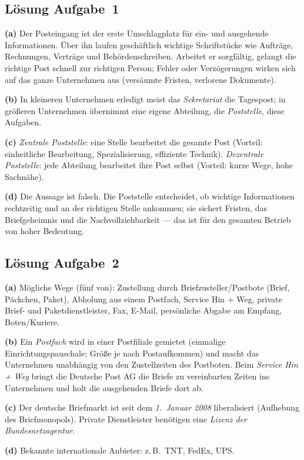 \documentclass[11pt, a4paper]{article}
\begin{document}
\subsection*{Lösung Aufgabe~1}
\begin{loesung}
\textbf{(a)} Der Posteingang ist der erste Umschlagplatz für ein- und ausgehende
Informationen. Über ihn laufen geschäftlich wichtige Schriftstücke wie Aufträge,
Rechnungen, Verträge und Behördenschreiben. Arbeitet er sorgfältig, gelangt die richtige
Post schnell zur richtigen Person; Fehler oder Verzögerungen wirken sich auf das ganze
Unternehmen aus (versäumte Fristen, verlorene Dokumente).

\textbf{(b)} In kleineren Unternehmen erledigt meist das \emph{Sekretariat} die Tagespost;
in größeren Unternehmen übernimmt eine eigene Abteilung, die \emph{Poststelle}, diese Aufgaben.

\textbf{(c)} \emph{Zentrale Poststelle}: eine Stelle bearbeitet die gesamte Post (Vorteil:
einheitliche Bearbeitung, Spezialisierung, effiziente Technik). \emph{Dezentrale Poststelle}:
jede Abteilung bearbeitet ihre Post selbst (Vorteil: kurze Wege, hohe Sachnähe).

\textbf{(d)} Die Aussage ist falsch. Die Poststelle entscheidet, ob wichtige Informationen
rechtzeitig und an der richtigen Stelle ankommen; sie sichert Fristen, das Briefgeheimnis und
die Nachvollziehbarkeit --- das ist für den gesamten Betrieb von hoher Bedeutung.
\end{loesung}

\subsection*{Lösung Aufgabe~2}
\begin{loesung}
\textbf{(a)} Mögliche Wege (fünf von): Zustellung durch Briefzusteller/Postbote (Brief,
Päckchen, Paket), Abholung aus einem Postfach, Service Hin + Weg, private Brief- und
Paketdienstleister, Fax, E-Mail, persönliche Abgabe am Empfang, Boten/Kuriere.

\textbf{(b)} Ein \emph{Postfach} wird in einer Postfiliale gemietet (einmalige
Einrichtungspauschale; Größe je nach Postaufkommen) und macht das Unternehmen unabhängig von
den Zustellzeiten des Postboten. Beim \emph{Service Hin + Weg} bringt die Deutsche Post AG die
Briefe zu vereinbarten Zeiten ins Unternehmen und holt die ausgehenden Briefe dort ab.

\textbf{(c)} Der deutsche Briefmarkt ist seit dem \emph{1.\ Januar 2008} liberalisiert
(Aufhebung des Briefmonopols). Private Dienstleister benötigen eine \emph{Lizenz der
Bundesnetzagentur}.

\textbf{(d)} Bekannte internationale Anbieter: z.\,B.\ TNT, FedEx, UPS.
\end{loesung}
\end{document}
